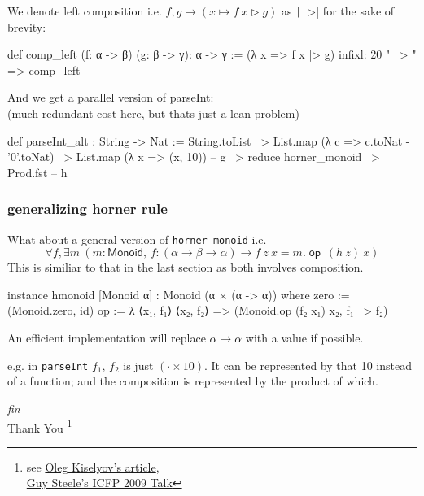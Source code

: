 \documentclass{beamer}
\newcommand\blfootnote[1]{%
  \begingroup
  \renewcommand\thefootnote{}\footnote{#1}%
  \addtocounter{footnote}{-1}%
  \endgroup
}
\DeclareMathOperator{\op}{\mathsf{op}}
\begin{document}
\begin{frame}[fragile]
    We denote left composition i.e. $f,g\mapsto (x\mapsto f\ x \rhd g)$ as \texttt|~>| for the sake of brevity:
\begin{leancode}
    def comp_left (f: α -> β) (g: β -> γ): α -> γ := (λ x => f x |> g)
    infixl: 20 " ~> " => comp_left
\end{leancode}
    And we get a parallel version of parseInt:\\
    (much redundant cost here, but thats just a lean problem)
    \begin{leancode}
        def parseInt_alt : String -> Nat :=
            String.toList
            ~> List.map (λ c => c.toNat - '0'.toNat)
            ~> List.map (λ x => (x, 10)) -- g
            ~> reduce horner_monoid
            ~> Prod.fst -- h
    \end{leancode}
\end{frame}
\begin{frame}[fragile]
    \frametitle{generalizing horner rule}
    What about a general version of \texttt{horner\_monoid} i.e.
    \[
        \forall f,\exists m\ (m: \mathsf{Monoid},\,f: (\alpha\to\beta\to\alpha)\to f\ z\ x = m.\op\ (h\ z)\ x)
    \]
    This is similiar to that in the last section as both involves composition.
\begin{leancode}
    instance hmonoid [Monoid α] : Monoid (α × (α -> α)) where
        zero := (Monoid.zero, id)
        op :=
            λ ⟨x₁, f₁⟩ ⟨x₂, f₂⟩ =>
                (Monoid.op (f₂ x₁) x₂, f₁ ~> f₂)
\end{leancode}
    An efficient implementation will replace $\alpha\to\alpha$ with a value if possible.

    e.g. in \texttt{parseInt} $f_1$, $f_2$ is just $(\cdot \times 10)$. It can be represented by that 10 instead of a function; and the composition is represented by the product of which.
\end{frame}
\begin{frame}{}
    \centering \Huge
    \emph{fin}\\
    \vspace{1.5cm}
    \huge{Thank You}
    \blfootnote{see \href{https://okmij.org/ftp/Algorithms/map-monoid-reduce.html}{Oleg Kiselyov's article},\\
     \quad\hphantom{Gsee }\href{https://web.archive.org/web/20091229162537/http://research.sun.com/projects/plrg/Publications/ICFPAugust2009Steele.pdf}{Guy Steele's ICFP 2009 Talk}}
\end{frame}
\end{document}
